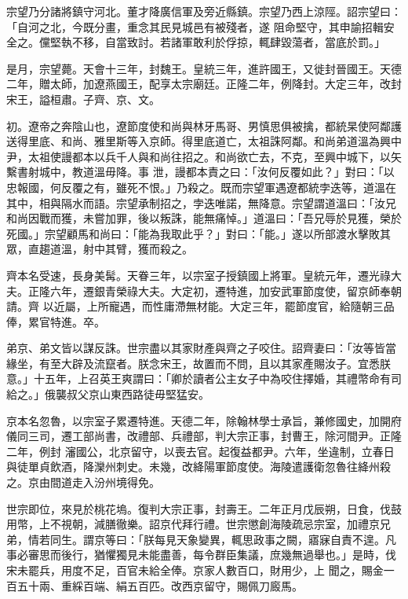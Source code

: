 \begin{pinyinscope}
 宗望乃分諸將鎮守河北。董才降廣信軍及旁近縣鎮。宗望乃西上涼陘。詔宗望曰：「自河之北，今既分畫，重念其民見城邑有被殘者，遂
 阻命堅守，其申諭招輯安全之。儻堅執不移，自當致討。若諸軍敢利於俘掠，輒肆毀蕩者，當底於罰。」



 是月，宗望薨。天會十三年，封魏王。皇統三年，進許國王，又徙封晉國王。天德二年，贈太師，加遼燕國王，配享太宗廟廷。正隆二年，例降封。大定三年，改封宋王，謚桓肅。子齊、京、文。



 初。遼帝之奔陰山也，遼節度使和尚與林牙馬哥、男慎思俱被擒，都統杲使阿鄰護送得里底、和尚、雅里斯等入京師。得里底道亡，太祖誅阿鄰。和尚弟道溫為興中尹，太祖使謾都本以兵千人與和尚往招之。和尚欲亡去，不克，至興中城下，以矢繫書射城中，教道溫毋降。事
 泄，謾都本責之曰：「汝何反覆如此？」對曰：「以忠報國，何反覆之有，雖死不恨。」乃殺之。既而宗望軍遇遼都統孛迭等，道溫在其中，相與隔水而語。宗望承制招之，孛迭唯諾，無降意。宗望謂道溫曰：「汝兄和尚因戰而獲，未嘗加罪，後以叛誅，能無痛悼。」道溫曰：「吾兄辱於見獲，榮於死國。」宗望顧馬和尚曰：「能為我取此乎？」對曰：「能。」遂以所部渡水擊敗其眾，直趨道溫，射中其臂，獲而殺之。



 齊本名受速，長身美髯。天眷三年，以宗室子授鎮國上將軍。皇統元年，遷光祿大夫。正隆六年，遷銀青榮祿大夫。大定初，遷特進，加安武軍節度使，留京師奉朝請。齊
 以近屬，上所寵遇，而性庸滯無材能。大定三年，罷節度官，給隨朝三品俸，累官特進。卒。



 弟京、弟文皆以謀反誅。世宗盡以其家財產與齊之子咬住。詔齊妻曰：「汝等皆當緣坐，有至大辟及流竄者。朕念宋王，故置而不問，且以其家產賜汝子。宜悉朕意。」十五年，上召英王爽謂曰：「卿於讀者公主女子中為咬住擇婚，其禮幣命有司給之。」俄襲叔父京山東西路徒毋堅猛安。



 京本名忽魯，以宗室子累遷特進。天德二年，除翰林學士承旨，兼修國史，加開府儀同三司，遷工部尚書，改禮部、兵禮部，判大宗正事，封曹王，除河間尹。正隆二年，例封
 瀋國公，北京留守，以喪去官。起復益都尹。六年，坐違制，立春日與徒單貞飲酒，降灤州刺史。未幾，改絳陽軍節度使。海陵遣護衛忽魯往絳州殺之。京由間道走入汾州境得免。



 世宗即位，來見於桃花塢。復判大宗正事，封壽王。二年正月戊辰朔，日食，伐鼓用幣，上不視朝，減膳徹樂。詔京代拜行禮。世宗懲創海陵疏忌宗室，加禮京兄弟，情若同生。謂京等曰：「朕每見天象變異，輒思政事之闕，寤寐自責不遑。凡事必審思而後行，猶懼獨見未能盡善，每令群臣集議，庶幾無過舉也。」是時，伐宋未罷兵，用度不足，百官未給全俸。京家人數百口，財用少，上
 聞之，賜金一百五十兩、重綵百端、絹五百匹。改西京留守，賜佩刀廄馬。




\end{pinyinscope}
